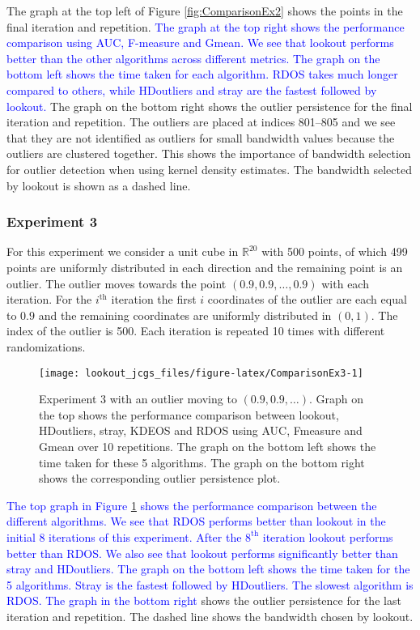 \documentclass[12pt]{article}
\theoremstyle{definition}
\theoremstyle{definition}
\theoremstyle{definition}
\theoremstyle{remark}
\begin{document}
The graph at the top left of Figure \ref{fig:ComparisonEx2} shows the points in the final iteration and repetition. \textcolor{blue}{ The graph at the top right shows the performance comparison using AUC, F-measure and Gmean. We see that lookout performs better than the other algorithms across different metrics. The graph on the bottom left shows the time taken for each algorithm. RDOS takes much longer compared to others, while HDoutliers and stray are the fastest followed by lookout.} The graph on the bottom right shows the outlier persistence for the final iteration and repetition. The outliers are placed at indices 801--805 and we see that they are not identified as outliers for small bandwidth values because the outliers are clustered together. This shows the importance of bandwidth selection for outlier detection when using kernel density estimates. The bandwidth selected by lookout is shown as a dashed line.

\hypertarget{experiment-3}{%
\subsubsection*{Experiment 3}\label{experiment-3}}

For this experiment we consider a unit cube in \(\mathbb{R}^{20}\) with 500 points, of which 499 points are uniformly distributed in each direction and the remaining point is an outlier. The outlier moves towards the point \(\left( 0.9, 0.9, \dots, 0.9 \right)\) with each iteration. For the \(i^{\text{th}}\) iteration the first \(i\) coordinates of the outlier are each equal to \(0.9\) and the remaining coordinates are uniformly distributed in \((0,1)\). The index of the outlier is 500. Each iteration is repeated 10 times with different randomizations.

\begin{figure}
\texttt{[image: lookout\_jcgs\_files/figure-latex/ComparisonEx3-1]} \caption{Experiment 3 with an outlier moving to $(0.9, 0.9, \dots)$. Graph on the top shows the performance comparison between lookout, HDoutliers, stray, KDEOS and RDOS using AUC, Fmeasure and Gmean over 10 repetitions. The graph on the bottom left shows the time taken for these 5 algorithms. The graph on the bottom right shows the corresponding outlier persistence plot.}\label{fig:ComparisonEx3}
\end{figure}

\textcolor{blue}{The top graph in Figure \ref{fig:ComparisonEx3} shows the performance comparison between the different algorithms. We see that RDOS performs better than lookout in the initial 8 iterations of this experiment. After the $8^{\text{th}}$ iteration lookout performs better than RDOS. We also see that lookout performs significantly better than stray and HDoutliers. The graph on the bottom left shows the time taken for the 5 algorithms. Stray is the fastest followed by HDoutliers. The slowest algorithm is RDOS. The graph in the bottom right } shows the outlier persistence for the last iteration and repetition. The dashed line shows the bandwidth chosen by lookout.
\end{document}
